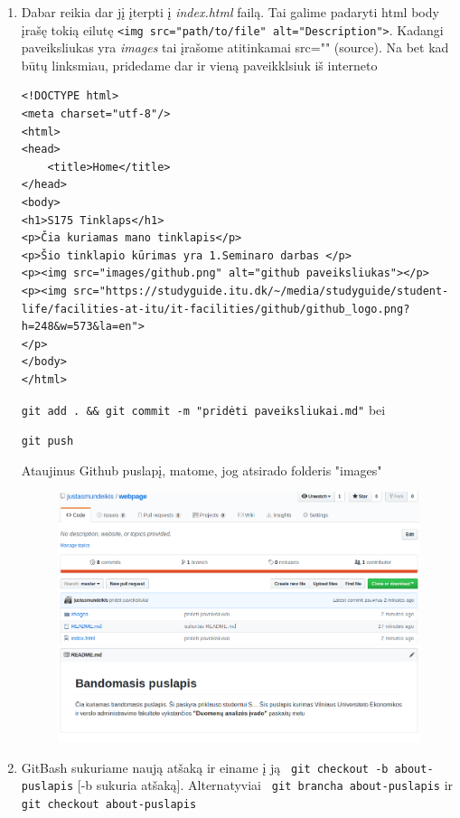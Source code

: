 \documentclass[12pt,a4paper]{article}
\begin{document}
\begin{enumerate}
\item Dabar reikia dar jį įterpti į \textit{index.html} failą. Tai galime padaryti html body įrašę tokią eilutę \colorbox{listinggray}{\lstinline|<img src="path/to/file" alt="Description">|}. Kadangi paveiksliukas yra \textit{images} tai įrašome atitinkamai src="" (source). Na bet kad būtų linksmiau, pridedame dar ir  vieną paveikklsiuk iš interneto 

\begin{lstlisting}
<!DOCTYPE html>
<meta charset="utf-8"/>
<html>
<head>
	<title>Home</title>
</head>
<body>
<h1>S175 Tinklaps</h1>
<p>Čia kuriamas mano tinklapis</p>
<p>Šio tinklapio kūrimas yra 1.Seminaro darbas </p>
<p><img src="images/github.png" alt="github paveiksliukas"></p>
<p><img src="https://studyguide.itu.dk/~/media/studyguide/student-life/facilities-at-itu/it-facilities/github/github_logo.png?h=248&w=573&la=en">
</p>
</body>
</html>
\end{lstlisting}

\colorbox{listinggray}{\lstinline|git add . && git commit -m "pridėti paveiksliukai.md"|} bei

\colorbox{listinggray}{\lstinline|git push|}

Ataujinus Github puslapį, matome, jog atsirado folderis "images"

\begin{figure}[H]
\center
\includegraphics[scale=0.4]{webpage_9.png}
\end{figure}

\item GitBash sukuriame naują atšaką ir einame į ją \colorbox{listinggray}{\lstinline| git checkout -b about-puslapis|} [-b sukuria atšaką]. Alternatyviai \colorbox{listinggray}{\lstinline| git brancha about-puslapis|} ir \colorbox{listinggray}{\lstinline| git checkout about-puslapis|}
 

\end{enumerate}
\end{document}
